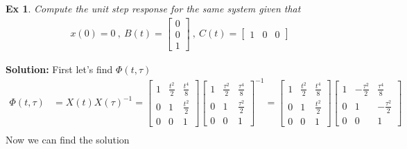 \documentclass[twoside]{article}
\newtheorem{exmp}[theorem]{Ex}
\begin{document}
\begin{exmp}
Compute the unit step response for the same system given that
\begin{align*}
	x(0) = 0 \ , \ B(t) = \begin{bmatrix} 0 \\ 0 \\ 1 \end{bmatrix} 
	\ , \
	C(t) = \begin{bmatrix} 1 & 0 & 0 \end{bmatrix} 
\end{align*}
\end{exmp}
%
\textbf{Solution:} First let's find $\Phi(t , \tau)$
%
\begin{align*}
	\Phi(t , \tau) &= X(t) X(\tau)^{-1} = \begin{bmatrix} 1 & \frac{t^2}{2} & \frac{t^4}{8} \\ 0 & 1 & \frac{t^2}{2} \\ 0 & 0 & 1 \end{bmatrix} 
	\begin{bmatrix} 1 & \frac{\tau^2}{2} & \frac{\tau^4}{8} \\ 0 & 1 & \frac{\tau^2}{2} \\ 0 & 0 & 1 \end{bmatrix}^{-1}
	= \begin{bmatrix} 1 & \frac{t^2}{2} & \frac{t^4}{8} \\ 0 & 1 & \frac{t^2}{2} \\ 0 & 0 & 1 \end{bmatrix} 
	\begin{bmatrix} 1 & -\frac{\tau^2}{2} & \frac{\tau^4}{8}  \\ 0 & 1 & -\frac{\tau^2}{2} \\ 0 & 0 & 1 \end{bmatrix}
	\\
\end{align*}
%
Now we can find the solution
%
\end{document}
